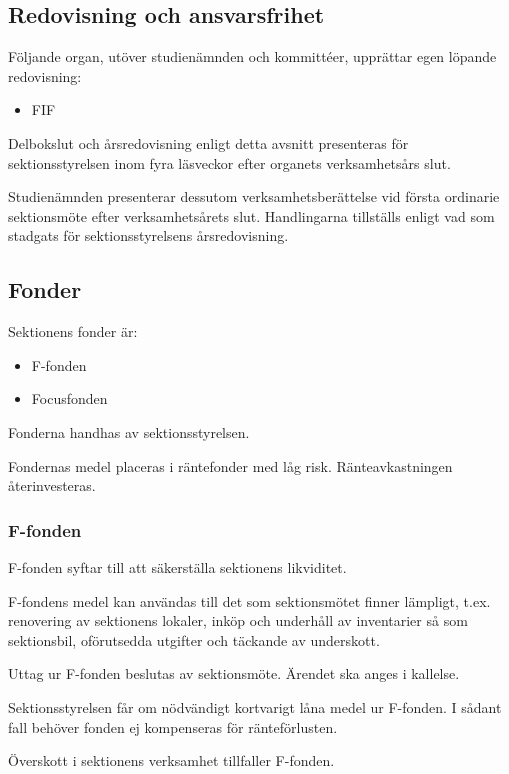 \documentclass{styrdokument}
\begin{document}
\subsection{Redovisning och ansvarsfrihet}
\? Följande organ, utöver studienämnden och kommittéer, upprättar egen löpande redovisning:
\begin{itemize}
    \item FIF
\end{itemize}

\? Delbokslut och årsredovisning enligt detta avsnitt presenteras för sektionsstyrelsen inom fyra läsveckor efter organets verksamhetsårs slut.

\? Studienämnden presenterar dessutom verksamhetsberättelse vid första ordinarie sektionsmöte efter verksamhetsårets slut.
Handlingarna tillställs enligt vad som stadgats för sektionsstyrelsens årsredovisning.


\subsection{Fonder}
\? Sektionens fonder är:
\begin{itemize}
    \item F-fonden
    \item Focusfonden
\end{itemize}

\? Fonderna handhas av sektionsstyrelsen.

\? Fondernas medel placeras i räntefonder med låg risk.
Ränteavkastningen återinvesteras.

\subsubsection{F-fonden}
\? F-fonden syftar till att säkerställa sektionens likviditet.

\? F-fondens medel kan användas till det som sektionsmötet finner lämpligt, t.ex. renovering av sektionens lokaler, inköp och underhåll av inventarier så som sektionsbil, oförutsedda utgifter och täckande av underskott.

\? Uttag ur F-fonden beslutas av sektionsmöte.
Ärendet ska anges i kallelse.

\? Sektionsstyrelsen får om nödvändigt kortvarigt låna medel ur F-fonden.
I sådant fall behöver fonden ej kompenseras för ränteförlusten.

\? Överskott i sektionens verksamhet tillfaller F-fonden.
\end{document}
